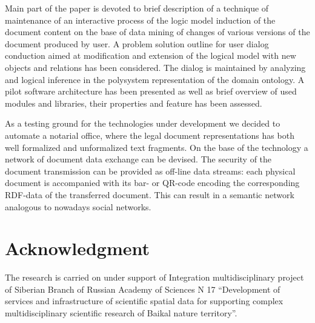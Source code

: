 \documentclass[conference]{IEEEtran}
\begin{document}
Main part of the paper is devoted to brief description of a technique
of maintenance of an interactive process of the logic model induction
of the document content on the base of data mining of changes of
various versions of the document produced by user.  A problem solution
outline for user dialog conduction aimed at modification and extension
of the logical model with new objects and relations has been
considered.  The dialog is maintained by analyzing and logical
inference in the polysystem representation of the domain ontology.  A
pilot software architecture has been presented as well as brief
overview of used modules and libraries, their properties and feature
has been assessed.

As a testing ground for the technologies under development we decided
to automate a notarial office, where the legal document
representations has both well formalized and unformalized text
fragments.  On the base of the technology a network of document data
exchange can be devised. The security of the document transmission can
be provided as off-line data streams: each physical document is
accompanied with its bar- or QR-code encoding the corresponding
RDF-data of the transferred document. This can result in a semantic
network analogous to nowadays social networks.




\section*{Acknowledgment}
The research is carried on under support of Integration multidisciplinary project of Siberian Branch of Russian Academy of Sciences N 17 “Development of services and infrastructure of scientific spatial data for supporting complex multidisciplinary scientific research of Baikal nature territory”.







\end{document}
